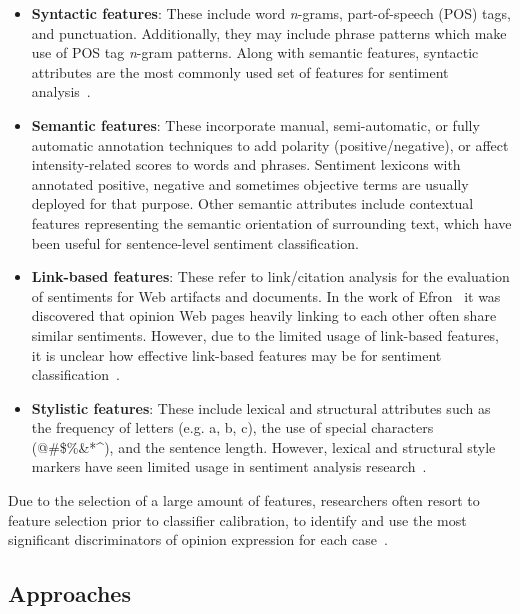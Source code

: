 \begin{itemize}
 \item \textbf{Syntactic features}:
 These include word \emph{n}-grams, part-of-speech (POS) tags, and punctuation.
 Additionally, they may include phrase patterns
 which make use of POS tag \emph{n}-gram patterns.
 Along with semantic features,
 syntactic attributes are the most commonly used set of features
 for sentiment analysis~\cite{ACS08}.
 
 \item \textbf{Semantic features}:
 These incorporate manual, semi-automatic,
 or fully automatic annotation techniques to add polarity (positive/negative),
 or affect intensity-related scores to words and phrases.
 Sentiment lexicons with annotated positive, negative
 and sometimes objective terms are usually deployed for that purpose.
 Other semantic attributes include contextual features
 representing the semantic orientation of surrounding text,
 which have been useful for sentence-level sentiment classification.
 
 \item \textbf{Link-based features}:
 These refer to link/citation analysis
 for the evaluation of sentiments for Web artifacts and documents.
 In the work of Efron~\cite{Efr08} it was discovered that opinion Web pages
 heavily linking to each other often share similar sentiments.
 However, due to the limited usage of link-based features,
 it is unclear how effective link-based features may be
 for sentiment classification~\cite{ACS08}.
 
 \item \textbf{Stylistic features}:
 These include lexical and structural attributes such as
 the frequency of letters (e.g. a, b, c),
 the use of special characters (@\#\$\%\&*\^{}),
 and the sentence length.
 However, lexical and structural style markers have seen limited usage
 in sentiment analysis research~\cite{ACS08}. 
\end{itemize}

Due to the selection of a large amount of features,
researchers often resort to feature selection prior to classifier calibration,
to identify and use the most significant discriminators of
opinion expression for each case~\cite{GSZ13,ACS08,Gam04}.

\subsection{Approaches}
\label{subsec:approaches}

